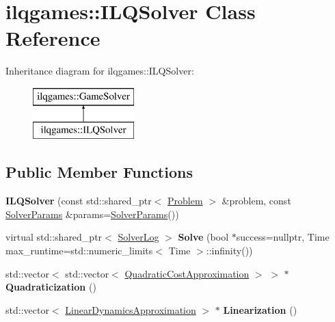 \hypertarget{classilqgames_1_1_i_l_q_solver}{}\section{ilqgames\+:\+:I\+L\+Q\+Solver Class Reference}
\label{classilqgames_1_1_i_l_q_solver}
Inheritance diagram for ilqgames\+:\+:I\+L\+Q\+Solver\+:\begin{figure}[H]
\begin{center}
\leavevmode
\includegraphics[height=2.000000cm]{classilqgames_1_1_i_l_q_solver}
\end{center}
\end{figure}
\subsection*{Public Member Functions}
\begin{DoxyCompactItemize}
\item 
{\bfseries I\+L\+Q\+Solver} (const std\+::shared\+\_\+ptr$<$ \hyperlink{classilqgames_1_1_problem}{Problem} $>$ \&problem, const \hyperlink{structilqgames_1_1_solver_params}{Solver\+Params} \&params=\hyperlink{structilqgames_1_1_solver_params}{Solver\+Params}())\hypertarget{classilqgames_1_1_i_l_q_solver_a873b090b6a55ce1c33f780942c51e464}{}\label{classilqgames_1_1_i_l_q_solver_a873b090b6a55ce1c33f780942c51e464}

\item 
virtual std\+::shared\+\_\+ptr$<$ \hyperlink{classilqgames_1_1_solver_log}{Solver\+Log} $>$ {\bfseries Solve} (bool $\ast$success=nullptr, Time max\+\_\+runtime=std\+::numeric\+\_\+limits$<$ Time $>$\+::infinity())\hypertarget{classilqgames_1_1_i_l_q_solver_ad86d47ce8a04ab5f8e8fcfbf3db6b02e}{}\label{classilqgames_1_1_i_l_q_solver_ad86d47ce8a04ab5f8e8fcfbf3db6b02e}

\item 
std\+::vector$<$ std\+::vector$<$ \hyperlink{structilqgames_1_1_quadratic_cost_approximation}{Quadratic\+Cost\+Approximation} $>$ $>$ $\ast$ {\bfseries Quadraticization} ()\hypertarget{classilqgames_1_1_i_l_q_solver_aff4b3d9342d6813ba328633676f14c90}{}\label{classilqgames_1_1_i_l_q_solver_aff4b3d9342d6813ba328633676f14c90}

\item 
std\+::vector$<$ \hyperlink{structilqgames_1_1_linear_dynamics_approximation}{Linear\+Dynamics\+Approximation} $>$ $\ast$ {\bfseries Linearization} ()\hypertarget{classilqgames_1_1_i_l_q_solver_ae7eb0d1f56161f69ccfd7db875ca87ae}{}\label{classilqgames_1_1_i_l_q_solver_ae7eb0d1f56161f69ccfd7db875ca87ae}

\end{DoxyCompactItemize}
